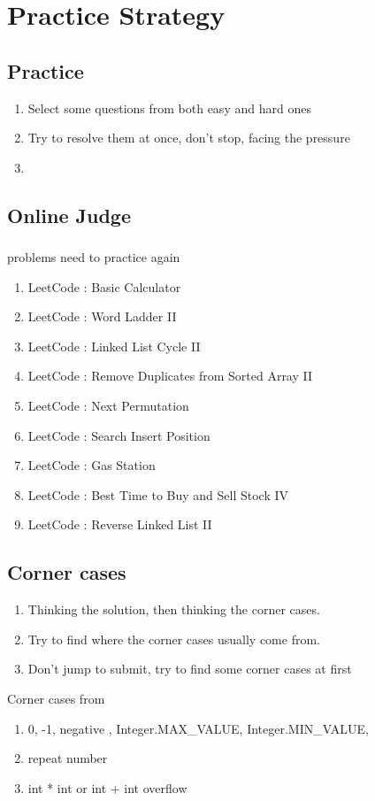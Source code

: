 \chapter{Practice Strategy}

\section{Practice }
\begin{enumerate}
    \item Select some questions from both easy and hard ones
    \item Try to resolve them at once, don't stop, facing the pressure
    \item
\end{enumerate}

\section{Online Judge }

\subsection{}

problems need to practice again

\begin{enumerate}
    \item LeetCode : Basic Calculator
    \item LeetCode : Word Ladder II
    \item LeetCode : Linked List Cycle II
    \item LeetCode : Remove Duplicates from Sorted Array II
    \item LeetCode : Next Permutation
    \item LeetCode : Search Insert Position
    \item LeetCode : Gas Station
    \item LeetCode : Best Time to Buy and Sell Stock IV
    \item LeetCode : Reverse Linked List II 
\end{enumerate}



\section{Corner cases     }

\begin{enumerate}
    \item Thinking the solution, then thinking the corner cases.
    \item Try to find where the corner cases usually come from.
    \item Don't jump to submit, try to find some corner cases at first
\end{enumerate}

Corner cases from

\begin{enumerate}
    \item  0, -1, negative , Integer.MAX\_VALUE, Integer.MIN\_VALUE,
    \item  repeat number
    \item  int * int or int + int overflow
\end{enumerate}


